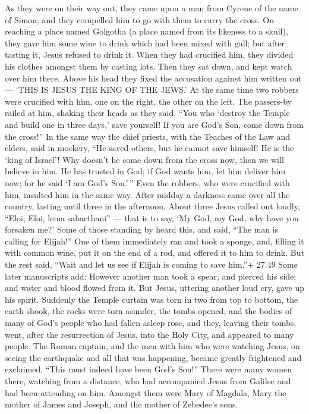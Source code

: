  As they were on their way out, they came upon a man from
Cyrene of the name of Simon; and they compelled him to go with them to
carry the cross.  On reaching a place named Golgotha (a
place named from its likeness to a skull),  they gave him
some wine to drink which had been mixed with gall; but after tasting it,
Jesus refused to drink it.  When they had crucified him,
they divided his clothes amongst them by casting lots. 
Then they sat down, and kept watch over him there.  Above
his head they fixed the accusation against him written out --- `THIS IS
JESUS THE KING OF THE JEWS.'  At the same time two robbers
were crucified with him, one on the right, the other on the left.
 The passers-by railed at him, shaking their heads as they
said,  ``You who `destroy the Temple and build one in three
days,' save yourself! If you are God's Son, come down from the cross!''
 In the same way the chief priests, with the Teaches of the
Law and elders, said in mockery,  ``He saved others, but he
cannot save himself! He is the `king of Israel'! Why doesn't he come
down from the cross now, then we will believe in him.  He
has trusted in God; if God wants him, let him deliver him now; for he
said `I am God's Son.'\,''  Even the robbers, who were
crucified with him, insulted him in the same way.  After
midday a darkness came over all the country, lasting until three in the
afternoon.  About three Jesus called out loudly, ``Eloi,
Eloi, lema sabacthani'' --- that is to say, `My God, my God, why have
you forsaken me?'  Some of those standing by heard this,
and said, ``The man is calling for Elijah!''  One of them
immediately ran and took a sponge, and, filling it with common wine, put
it on the end of a rod, and offered it to him to drink. 
But the rest said, ``Wait and let us see if Elijah is coming to save
him.''+ 27.49 Some later manuscripts add: However another man took a
spear, and pierced his side; and water and blood flowed from it.
 But Jesus, uttering another loud cry, gave up his spirit.
 Suddenly the Temple curtain was torn in two from top to
bottom, the earth shook, the rocks were torn asunder,  the
tombs opened, and the bodies of many of God's people who had fallen
asleep rose,  and they, leaving their tombs, went, after
the resurrection of Jesus, into the Holy City, and appeared to many
people.  The Roman captain, and the men with him who were
watching Jesus, on seeing the earthquake and all that was happening,
became greatly frightened and exclaimed, ``This must indeed have been
God's Son!''  There were many women there, watching from a
distance, who had accompanied Jesus from Galilee and had been attending
on him.  Amongst them were Mary of Magdala, Mary the mother
of James and Joseph, and the mother of Zebedee's sons.


